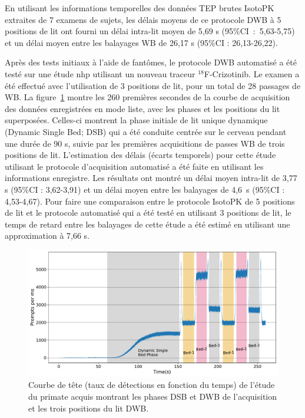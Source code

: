 En utilisant les informations temporelles des données TEP brutes IsotoPK extraites de 7 examens de sujets, les délais moyens de ce protocole DWB à 5 positions de lit ont fourni un délai intra-lit moyen de 5,69 s \mbox{(95\%CI : 5,63-5,75)} et un délai moyen entre les balayages WB de 26,17 s (95\%CI : 26,13-26,22).
 
Après des tests initiaux à l'aide de fantômes, le protocole DWB automatisé a été testé sur une étude \gls{nhp} utilisant un nouveau traceur $^{18}$F-Crizotinib. Le examen a été effectué avec l'utilisation de 3 positions de lit, pour un total de 28 passages de WB.
La figure~\ref{Resumefig3_1:Macaque_Head_Curve_Phases} montre les 260 premières secondes de la courbe de acquisition des données enregistrées en mode liste, avec les phases et les positions du lit superposées. Celles-ci montrent la phase initiale de lit unique dynamique (Dynamic Single Bed; DSB) qui a été conduite centrée sur le cerveau
pendant une durée de 90 s, suivie par les premières acquisitions de passes WB de trois positions de lit.
L'estimation des délais (écarts temporels) pour cette étude utilisant le protocole d'acquisition automatisé a été faite en utilisant les informations enregistre. Les résultats ont montré un délai moyen intra-lit de 3,77 s (95\%CI : 3,62-3,91) et un délai moyen entre les balayages de \mbox{4,6 s} (95\%CI : 4,53-4,67). 
Pour faire une comparaison entre le protocole IsotoPK de 5 positions de lit et le protocole automatisé qui a été testé en utilisant 3 positions de lit, le temps de retard entre les balayages de cette étude a été estimé en utilisant une approximation à 7,66 s.

\begin{figure} [ht!]
\centering
\includegraphics[scale=0.45,angle=0]{./Resume/3_1_Macaque_Head_curve_Phases.pdf}
\caption{Courbe de tête (taux de détections en fonction du temps) de l'étude du primate acquis montrant les phases DSB et DWB de l'acquisition et les trois positions du lit DWB.}
\label{Resumefig3_1:Macaque_Head_Curve_Phases}
\end{figure}

